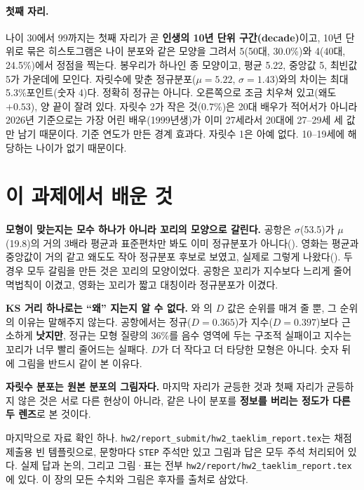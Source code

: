 \paragraph{첫째 자리.} 나이 30에서 99까지는 첫째 자리가 곧 \textbf{인생의 10년 단위
구간(decade)}이고, 10년 단위로 묶은 히스토그램은 나이 분포와 같은 모양을 그려서
5(50대, 30.0\%)와 4(40대, 24.5\%)에서 정점을 찍는다. 봉우리가 하나인 종 모양이고,
평균 5.22, 중앙값 5, 최빈값 5가 가운데에 모인다. 자릿수에 맞춘 정규분포($\mu = 5.22$,
$\sigma = 1.43$)와의 차이는 최대 5.3\%포인트(숫자 4)다. 정확히 정규는 아니다. 오른쪽으로
조금 치우쳐 있고(왜도 $+0.53$), 양 끝이 잘려 있다. 자릿수 2가 작은 것(0.7\%)은 20대 배우가
적어서가 아니라 2026년 기준으로는 가장 어린 배우(1999년생)가 이미 27세라서 20대에
27--29세 세 값만 남기 때문이다. 기준 연도가 만든 경계 효과다. 자릿수 1은 아예 없다.
10--19세에 해당하는 나이가 없기 때문이다.

\section{이 과제에서 배운 것}
\label{sec:hw2-learned}

\textbf{모형이 맞는지는 모수 하나가 아니라 꼬리의 모양으로 갈린다.} 공항은
$\sigma$(53.5)가 $\mu$(19.8)의 거의 3배라 평균과 표준편차만 봐도 이미 정규분포가
아니다(). 영화는 평균과 중앙값이 거의 같고 왜도도 작아 정규분포
후보로 보였고, 실제로 그렇게 나왔다(). 두 경우 모두 갈림을 만든
것은 꼬리의 모양이었다. 공항은 꼬리가 지수보다 느리게 줄어 멱법칙이 이겼고, 영화는
꼬리가 짧고 대칭이라 정규분포가 이겼다.

\textbf{KS 거리 하나로는 ``왜'' 지는지 알 수 없다.} 와
의 $D$ 값은 순위를 매겨 줄 뿐, 그 순위의 이유는 말해주지
않는다. 공항에서는 정규($D=0.365$)가 지수($D=0.397$)보다 근소하게 \textbf{낫지만},
정규는 모형 질량의 36\%를 음수 영역에 두는 구조적 실패이고 지수는 꼬리가 너무 빨리
줄어드는 실패다. $D$가 더 작다고 더 타당한 모형은 아니다. 숫자 뒤에 그림을 반드시
같이 본 이유다.

\textbf{자릿수 분포는 원본 분포의 그림자다.} 마지막 자리가 균등한 것과 첫째 자리가
균등하지 않은 것은 서로 다른 현상이 아니라, 같은 나이 분포를 \textbf{정보를 버리는
정도가 다른 두 렌즈}로 본 것이다.

마지막으로 자료 확인 하나. \texttt{hw2/report\_submit/hw2\_taeklim\_report.tex}는
채점 제출용 빈 템플릿으로, 문항마다 \texttt{STEP} 주석만 있고 그림과 답은 모두
주석 처리되어 있다. 실제 답과 논의, 그리고 그림·표는 전부
\texttt{hw2/report/hw2\_taeklim\_report.tex}에 있다. 이 장의 모든 수치와 그림은
후자를 출처로 삼았다.
